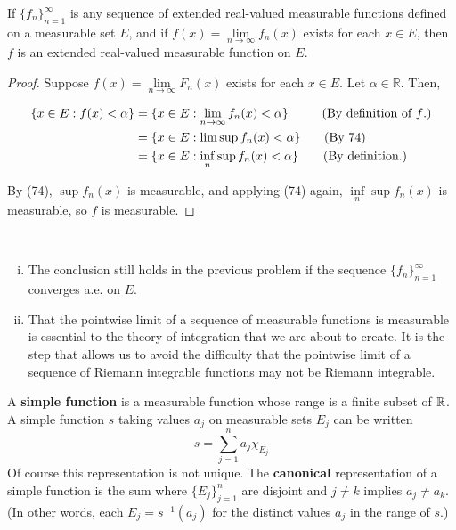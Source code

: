 \begin{pblm}\label{p:ext_real_val_seq}%
	If $\{f_n\}_{n=1}^\infty$ is any sequence of extended real-valued 
	measurable functions defined on a measurable set $E$, and if $f(x) = 
	\lim\limits_{n\to\infty}f_n(x)$ exists for each $x \in E$, then $f$ is an 
	extended real-valued measurable function on $E$. 
\begin{proof}
	Suppose $f(x) = \lim\limits_{n\to\infty} F_n(x)$ exists for each $x \in E$. Let $\alpha \in \mathbb{R}$. Then,

	\begin{align*}
		\{ x\in E : f(x) < \alpha \}
		&= \{ x \in E : \lim\limits_{n\to\infty}f_n(x) < \alpha \} \hspace{27 pt} \text{(By definition of $f$.)} \\
		&= \{ x \in E : \lim \sup f_n(x) < \alpha \} \hspace{19 pt} \text{(By 74)} \\
		&= \{ x \in E : \inf\limits_n \sup f_n(x) < \alpha \} \hspace{20 pt} \text{(By definition.)}
	\end{align*}
	
	By (74), $\sup f_n(x)$ is measurable, and applying (74) again, $\inf\limits_{n} \sup f_n(x)$ is measurable, so $f$ is measurable.
\end{proof}
\end{pblm}

\begin{rmk}%
	~
	\begin{enumerate}[(i)]
	\item The conclusion still holds in the previous problem if the sequence 
	$\{f_n\}_{n=1}^\infty$ converges a.e. on $E$. 
	\item That the pointwise limit of a sequence of measurable functions is 
	measurable is essential to the theory of integration that we are about to 
	create. It is the step that allows us to avoid the difficulty that the 
	pointwise limit of a sequence of Riemann integrable functions may not be 
	Riemann integrable. 
	\end{enumerate}
\end{rmk}

\begin{defn}\label{d:simplefunction}%
	A \textbf{simple function} is a measurable function whose range is a finite 
	subset of $\mathbb{R}$. A simple function $s$ taking values $a_j$ on measurable 
	sets $E_j$ can be written 
	\begin{equation*}
		s = \sum\limits_{j=1}^n a_j \chi_{E_j}
	\end{equation*}
	Of course this representation is not unique. The \textbf{canonical} 
	representation of a simple function is the sum where $\{E_j\}_{j=1}^n$ 
	are disjoint and $j \neq k$ implies $a_j \neq a_k$. (In other words, each 
	$E_j = s^{-1} (a_j)$ for the distinct values $a_j$ in the range of $s$.)
\end{defn}

